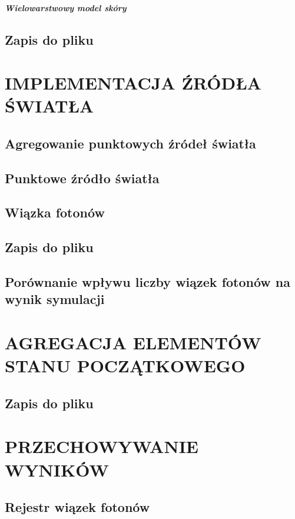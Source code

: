\paragraph{Wielowarstwowy model skóry}
\section{Zapis do pliku}



\chapter{IMPLEMENTACJA ŹRÓDŁA ŚWIATŁA}
\label{chpt:implementacja-źródła-światła}
\section{Agregowanie punktowych źródeł światła}
\section{Punktowe źródło światła}
\section{Wiązka fotonów}
\section{Zapis do pliku}
\section{Porównanie wpływu liczby wiązek fotonów na wynik symulacji}



\chapter{AGREGACJA ELEMENTÓW STANU POCZĄTKOWEGO}
\label{chpt:agregacja-elementów-stanu-początkowego}
\section{Zapis do pliku}



\chapter{PRZECHOWYWANIE WYNIKÓW}
\label{chpt:przechowywanie-wyników}
\section{Rejestr wiązek fotonów}
